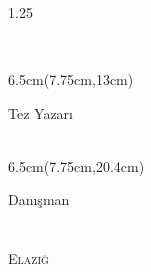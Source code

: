 
\begin{titlepage}

\centering

\begin{small}
	\textbf{\textsc{\antet\\}}
\end{small}


\vspace*{0.35cm}
\abd\\
\vspace*{0.7cm}
\derece\\
\vspace*{2.1cm}

\begin{spacing}{1.25}
\begin{Large}
\bfseries\textsc{\tezbasligi\\}
\end{Large}
\end{spacing}

\begin{textblock*}{6.5cm}(7.75cm,13cm) %
\begin{center}

\normalsize{Tez Yazarı}\\
\vspace{0.3cm}
\textbf{\tezyazari}\\
\end{center}
\end{textblock*}

\begin{textblock*}{6.5cm}(7.75cm,20.4cm) %
\begin{center}
\normalsize{Danışman}\\
\vspace{0.2cm} 
\danisman\\
\vspace{0.80cm}
\vspace{2.1cm}
\textsc{\ay}\: \yil \\ \textsc{Elazığ} \\
\end{center}
\end{textblock*}

\end{titlepage}
\restoregeometry

\newpage

